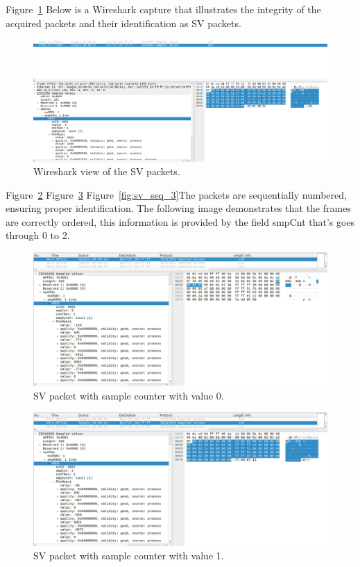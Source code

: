 Figure~\ref{fig:simple_sv} Below is a Wireshark capture that illustrates the integrity of the acquired packets and their identification as SV packets.

\begin{figure}[tbh!]
	\centering
	\includegraphics[width=1.00\textwidth, keepaspectratio]{ch6/assets/simple_sv.png} %
	\caption{Wireshark view of the SV packets.}
	\label{fig:simple_sv}
\end{figure}

Figure~\ref{fig:sv_seq_1} Figure~\ref{fig:sv_seq_2} Figure~\ref{fig:sv_seq_3}The packets are sequentially numbered, ensuring proper identification. The following image demonstrates that the frames are correctly ordered, this information is provided by the field smpCnt that's goes through 0 to 2.

\begin{figure}[tbh!]
	\centering
	\includegraphics[width=1.00\textwidth, keepaspectratio]{ch6/assets/sv_seq_1.png} %
	\caption{SV packet with sample counter with value 0.}
	\label{fig:sv_seq_1}
\end{figure}

\begin{figure}[tbh!]
	\centering
	\includegraphics[width=1.00\textwidth, keepaspectratio]{ch6/assets/sv_seq_2.png} %
	\caption{SV packet with sample counter with value 1.}
	\label{fig:sv_seq_2}
\end{figure}

